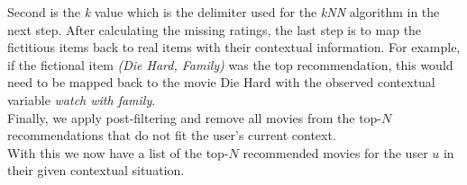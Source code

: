Second is the \textit{k} value which is the delimiter used for the \textit{kNN} algorithm in the next step.
After calculating the missing ratings, the last step is to map the fictitious items back to real items with their contextual information.
For example, if the fictional item \textit{(Die Hard, Family)} was the top recommendation, this would need to be mapped back to the movie Die Hard with the observed contextual variable \textit{watch with family}.\\
Finally, we apply post-filtering and remove all movies from the top-$N$ recommendations that do not fit the user's current context.\\
With this we now have a list of the top-$N$ recommended movies for the user $u$ in their given contextual situation.
